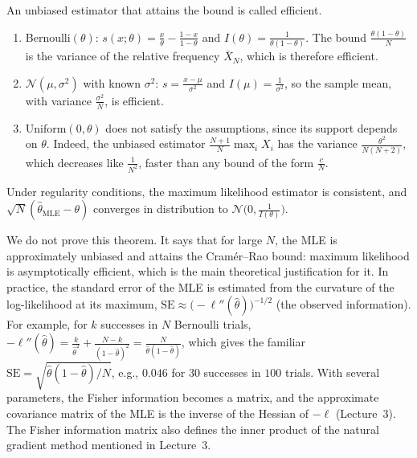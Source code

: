An unbiased estimator that attains the bound is called efficient.

\begin{example}\label{L4-ex:fisher}
    \begin{enumerate}
        \item Bernoulli$(\theta)$: $s(x; \theta) = \frac{x}{\theta} - \frac{1 - x}{1 - \theta}$ and $I(\theta) = \frac{1}{\theta(1 - \theta)}$. The bound $\frac{\theta(1 - \theta)}{N}$ is the variance of the relative frequency $\bar X_N$, which is therefore efficient.
        \item $\mathcal{N}(\mu, \sigma^2)$ with known $\sigma^2$: $s = \frac{x - \mu}{\sigma^2}$ and $I(\mu) = \frac{1}{\sigma^2}$, so the sample mean, with variance $\frac{\sigma^2}{N}$, is efficient.
        \item Uniform$(0, \theta)$ does not satisfy the assumptions, since its support depends on $\theta$. Indeed, the unbiased estimator $\frac{N + 1}{N}\max_i X_i$ has the variance $\frac{\theta^2}{N(N + 2)}$, which decreases like $\frac{1}{N^2}$, faster than any bound of the form $\frac{c}{N}$.
    \end{enumerate}
\end{example}

\begin{theorem}\label{L4-thm:mle-asymptotic}
    Under regularity conditions, the maximum likelihood estimator is consistent, and $\sqrt{N}(\hat\theta_{\text{MLE}} - \theta)$ converges in distribution to $\mathcal{N}\big(0, \frac{1}{I(\theta)}\big)$.
\end{theorem}

We do not prove this theorem. It says that for large $N$, the MLE is approximately unbiased and attains the Cram\'er--Rao bound: maximum likelihood is asymptotically efficient, which is the main theoretical justification for it. In practice, the standard error of the MLE is estimated from the curvature of the log-likelihood at its maximum, $\mathrm{SE} \approx \big(-\ell''(\hat\theta)\big)^{-1/2}$ (the observed information). For example, for $k$ successes in $N$ Bernoulli trials, $-\ell''(\hat\theta) = \frac{k}{\hat\theta^2} + \frac{N - k}{(1 - \hat\theta)^2} = \frac{N}{\hat\theta(1 - \hat\theta)}$, which gives the familiar $\mathrm{SE} = \sqrt{\hat\theta(1 - \hat\theta)/N}$, e.g., $0.046$ for $30$ successes in $100$ trials. With several parameters, the Fisher information becomes a matrix, and the approximate covariance matrix of the MLE is the inverse of the Hessian of $-\ell$ (Lecture~3). The Fisher information matrix also defines the inner product of the natural gradient method mentioned in Lecture~3.

